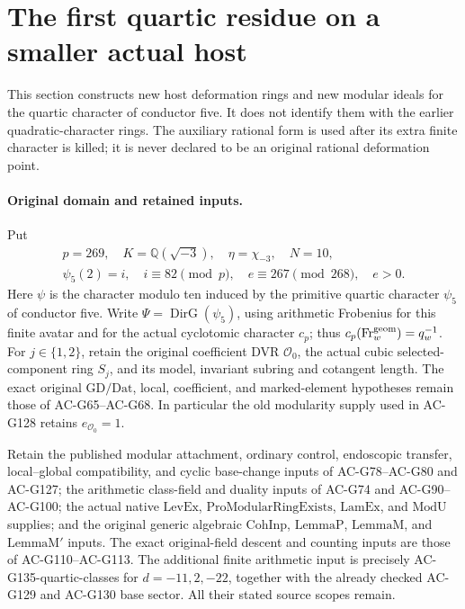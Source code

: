\section{The first quartic residue on a smaller actual host}
\label{sec:cubic-quartic-smaller-host-actual-model}

This section constructs new host deformation rings and new modular
ideals for the quartic character of conductor five.  It does not
identify them with the earlier quadratic-character rings.  The
auxiliary rational form is used after its extra finite character is
killed; it is never declared to be an original rational deformation
point.

\paragraph{Original domain and retained inputs.}
Put
\[
 \begin{gathered}
 p=269,\quad K=\mathbb Q(\sqrt{-3}),\quad
 \eta=\chi_{-3},\quad N=10,\\
 \psi_5(2)=i,\quad i\equiv82\pmod p,\quad
 e\equiv267\pmod{268},\quad e>0.
 \end{gathered}
 \tag{G136.1}
\]
Here \(\psi\) is the character modulo ten induced by the
primitive quartic character \(\psi_5\) of conductor five.
Write \(\Psi=\operatorname{DirG}(\psi_5)\), using arithmetic
Frobenius for this finite avatar and for the actual cyclotomic
character \(c_p\); thus
\(c_p(\operatorname{Fr}^{\rm geom}_w)=q_w^{-1}\).
For \(j\in\{1,2\}\), retain the original coefficient DVR
\(\mathcal O_0\), the actual cubic selected-component ring
\(S_j\), and its model, invariant subring and cotangent length.
The exact original \(\mathrm{GD}/\mathrm{Dat}\), local,
coefficient, and marked-element hypotheses remain those of
AC-G65--AC-G68.  In particular the old modularity supply used
in AC-G128 retains \(e_{\mathcal O_0}=1\).

Retain the published modular attachment, ordinary control,
endoscopic transfer, local--global compatibility, and cyclic
base-change inputs of AC-G78--AC-G80 and AC-G127; the arithmetic
class-field and duality inputs of AC-G74 and AC-G90--AC-G100;
the actual native \(\mathrm{LevEx}\),
\(\mathrm{ProModularRingExists}\), \(\mathrm{LamEx}\), and
\(\mathrm{ModU}\) supplies; and the original generic algebraic
\(\mathrm{CohInp}\), \(\mathrm{LemmaP}\),
\(\mathrm{LemmaM}\), and \(\mathrm{LemmaM'}\) inputs.
The exact original-field descent and counting inputs are those
of AC-G110--AC-G113.  The additional finite arithmetic input
is precisely AC-G135-quartic-classes for
\(d=-11,2,-22\), together with the already checked AC-G129
and AC-G130 base sector.  All their stated source scopes remain.

